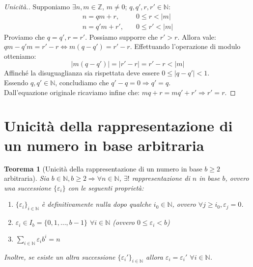 \documentclass[12pt]{article}
\newcommand{\N}{\mathbb{N}}
\newcommand{\Z}{\mathbb{Z}}
\newcommand{\sesolose}{\Leftrightarrow}
\newcommand{\implica}{\Longrightarrow}
\newcommand{\nin}{\forall n\in\N}
\newcommand{\eps}{\varepsilon}
\newtheorem{theorem}{Teorema}
\begin{document}
\begin{proof}[Unicità.]
	Supponiamo $\exists n, m \in \Z$, $m \ne 0$; $q, q', r, r' \in \N$:
	\begin{align*}
		n = qm + r,   & \quad 0 \le r < |m|  \\
		n = q'm + r', & \quad 0 \le r' < |m|
	\end{align*}
	Proviamo che $ q = q', r = r'$. Possiamo supporre che $r' > r$. Allora vale:
	\\$ qm - q'm = r' - r \sesolose m(q-q') = r'-r$. Effettuando l'operazione di modulo otteniamo:
		$$ |m(q-q')| = |r' - r| = r' - r < |m|$$
		Affinché la disuguaglianza sia rispettata deve essere $ 0 \le |q-q'| < 1 $.
		\\ Essendo $q, q' \in \N$, concludiamo che $q' - q = 0 \implica q' = q$.
		\\ Dall'equazione originale ricaviamo infine che: $mq + r = mq' + r' \implica r' = r$.
\end{proof}

\section{Unicità della rappresentazione di un numero in base arbitraria}
\begin{theorem}[Unicità della rappresentazione di un numero in base $b \ge 2$ arbitraria]
	Sia $b \in \N, b \ge 2 \implica \nin$, $\exists!$ rappresentazione di $n$ in base $b$, ovvero una successione $\{\eps_{i}\}$ con le seguenti proprietà:
	\begin{enumerate}
		\item $\{\eps_i\}_{i\in\N}$ è definitivamente nulla dopo qualche $i_{0}\in\N$, ovvero $\forall j \ge i_{0}, \eps_{j} = 0$.
		\item $\eps_i \in I_b = \{0, 1,\ldots ,b-1\}$ $\forall i \in \N$ (ovvero $0 \le \eps_i < b$)
		\item $\displaystyle\sum_{i\in\N} \eps_{i}b^i = n$
	\end{enumerate}
	Inoltre, se esiste un altra successione $\{\eps_i'\}_{i\in\N}$ allora $\eps_i = \eps_{i}'$ $\forall i \in \N$.
\end{theorem}
\end{document}
